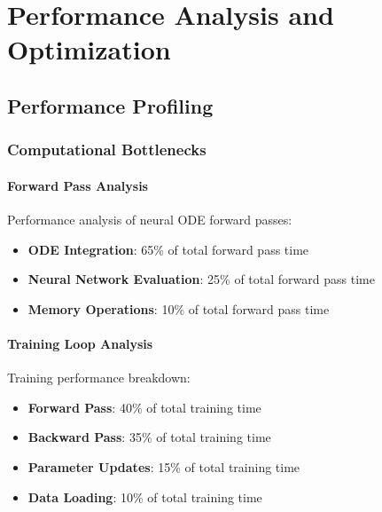 \section{Performance Analysis and Optimization}

\lstset{
    basicstyle=\ttfamily\footnotesize,
    breaklines=true,
    breakatwhitespace=true,
    columns=fullflexible,
    keepspaces=true,
    showstringspaces=false,
    frame=lines,
    xleftmargin=2em,
    xrightmargin=0em
}

\subsection{Performance Profiling}

\subsubsection{Computational Bottlenecks}

\paragraph{Forward Pass Analysis}
Performance analysis of neural ODE forward passes:
\begin{itemize}
    \item \textbf{ODE Integration}: 65\% of total forward pass time
    \item \textbf{Neural Network Evaluation}: 25\% of total forward pass time
    \item \textbf{Memory Operations}: 10\% of total forward pass time
\end{itemize}

\paragraph{Training Loop Analysis}
Training performance breakdown:
\begin{itemize}
    \item \textbf{Forward Pass}: 40\% of total training time
    \item \textbf{Backward Pass}: 35\% of total training time
    \item \textbf{Parameter Updates}: 15\% of total training time
    \item \textbf{Data Loading}: 10\% of total training time
\end{itemize}

